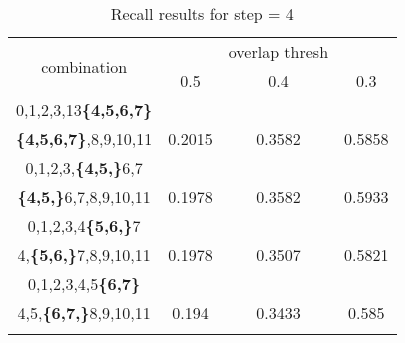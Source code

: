 \begin{center}
\begin{longtable}{||c||c c c||}

  \hline
  \multirow{2}{5em}{combination} & {} &overlap thresh & {} \\
                                    &  0.5  &  0.4 &  0.3 \\         
  \hline  \hline
  0,1,2,3,13\textbf{\{4,5,6,7\}}                & {} & {} & {} \\
  \textbf{\{4,5,6,7\}},8,9,10,11                & 0.2015   & 0.3582 & 0.5858 \\
  \hline     \hline                          

  0,1,2,3,\textbf{\{4,5,\}}6,7                  & {} & {} & {} \\
  \textbf{\{4,5,\}}6,7,8,9,10,11                & 0.1978   & 0.3582 & 0.5933 \\
  \hline                          
  0,1,2,3,4\textbf{\{5,6,\}}7                   & {} & {} & {} \\
  4,\textbf{\{5,6,\}}7,8,9,10,11                & 0.1978   & 0.3507 & 0.5821 \\
  \hline                          
  0,1,2,3,4,5\textbf{\{6,7\}}                   & {} & {} & {} \\
  4,5,\textbf{\{6,7,\}}8,9,10,11                & 0.194   & 0.3433 & 0.585 \\
  \hline                           
  \caption{Recall results for step = 4}
  \label{table:step4_8}
\end{longtable} 
\end{center}

